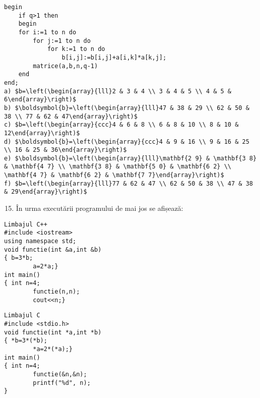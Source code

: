 \begin{verbatim}
begin
    if q>1 then
    begin
    for i:=1 to n do
        for j:=1 to n do
            for k:=1 to n do
                b[i,j]:=b[i,j]+a[i,k]*a[k,j];
        matrice(a,b,n,q-1)
    end
end;
a) $b=\left(\begin{array}{lll}2 & 3 & 4 \\ 3 & 4 & 5 \\ 4 & 5 & 6\end{array}\right)$
b) $\boldsymbol{b}=\left(\begin{array}{lll}47 & 38 & 29 \\ 62 & 50 & 38 \\ 77 & 62 & 47\end{array}\right)$
c) $b=\left(\begin{array}{ccc}4 & 6 & 8 \\ 6 & 8 & 10 \\ 8 & 10 & 12\end{array}\right)$
d) $\boldsymbol{b}=\left(\begin{array}{ccc}4 & 9 & 16 \\ 9 & 16 & 25 \\ 16 & 25 & 36\end{array}\right)$
е) $\boldsymbol{b}=\left(\begin{array}{lll}\mathbf{2 9} & \mathbf{3 8} & \mathbf{4 7} \\ \mathbf{3 8} & \mathbf{5 0} & \mathbf{6 2} \\ \mathbf{4 7} & \mathbf{6 2} & \mathbf{7 7}\end{array}\right)$
f) $b=\left(\begin{array}{lll}77 & 62 & 47 \\ 62 & 50 & 38 \\ 47 & 38 & 29\end{array}\right)$
\end{verbatim}

\begin{enumerate}
  \setcounter{enumi}{14}
  \item În urma executării programului de mai jos se afișează:
\end{enumerate}

\begin{verbatim}
Limbajul C++
#include <iostream>
using namespace std;
void functie(int &a,int &b)
{ b=3*b;
        a=2*a;}
int main()
{ int n=4;
        functie(n,n);
        cout<<n;}
\end{verbatim}

\begin{verbatim}
Limbajul C
#include <stdio.h>
void functie(int *a,int *b)
{ *b=3*(*b);
        *a=2*(*a);}
int main()
{ int n=4;
        functie(&n,&n);
        printf("%d", n);
}
\end{verbatim}

